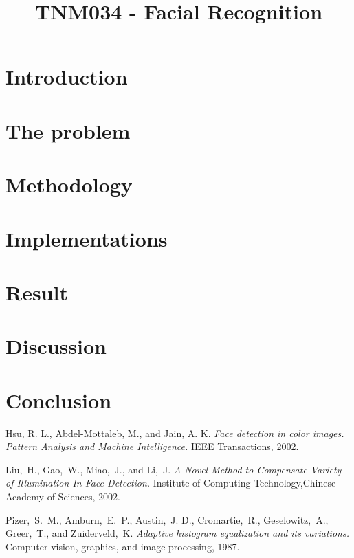 \documentclass[conference]{IEEEtran}
\begin{document}
\title{TNM034 - Facial Recognition}

\author{
\and
{}
\and
{}
}

\maketitle

\begin{abstract}

\end{abstract}

\section{Introduction}


\section{The problem}


\section{Methodology}


\section{Implementations}


\section{Result}


\section{Discussion}


\section{Conclusion}


\begin{thebibliography}{1}

Hsu, R. L., Abdel-Mottaleb, M., and Jain, A. K. \emph{Face detection in color images. Pattern Analysis and Machine Intelligence.} IEEE Transactions, 2002.

Liu,~H., Gao,~W., Miao,~J., and Li,~J. \emph{A Novel Method to Compensate Variety of Illumination In Face Detection.} Institute of Computing Technology,Chinese Academy of Sciences, 2002.

Pizer,~S.~M., Amburn,~E.~P., Austin,~J. D., Cromartie,~R., Geselowitz,~A., Greer,~T., and Zuiderveld,~K. \emph{Adaptive histogram equalization and its variations.} Computer vision, graphics, and image processing, 1987.

\end{thebibliography}

\end{document}

